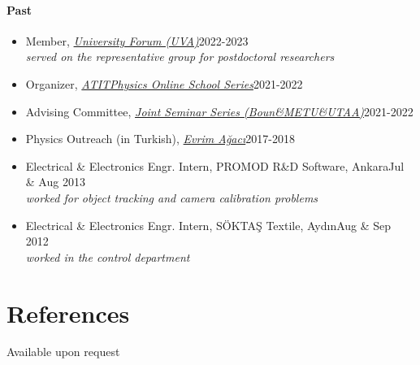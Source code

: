\documentclass[a4paper,11pt]{article}
\begin{document}
\paragraph{Past}
\begin{itemize}
	\item[] Member, \emph{\hyperref{https://www.uva.nl/en/about-the-uva/policy-and-regulations/policy/university-forum/university-forum.html}{}{}{University Forum (UVA)}}\hfill 2022-2023\hspace*{2.2em}\\
	    \hspace*{1.8em}\emph{served on the representative group for postdoctoral researchers}
	\item[] Organizer, \emph{\hyperref{https://www.atitphysics.com}{}{}{ATITPhysics Online School Series}}\hfill 2021-2022\hspace*{2.2em}
	\item[] Advising Committee, \emph{\hyperref{https://sites.google.com/view/boun-metu-utaajointseminerseri/}{}{}{Joint Seminar Series (Boun\&METU\&UTAA)}}\hfill 2021-2022\hspace*{2.2em}
	\item[] Physics Outreach (in Turkish), \emph{\hyperref{https://youtube.com/playlist?list=PL48IwtBKtXrZcWuuJFpcflBkSqJv6YrW9}{}{}{Evrim Ağacı}}\hfill 2017-2018
	\item[] Electrical \& Electronics Engr. Intern, PROMOD R\&D Software, Ankara\hfill Jul \& Aug 2013\\	
	    \hspace*{1.8em}\emph{worked for object tracking and camera calibration problems}
	\item[] Electrical \& Electronics Engr. Intern, SÖKTAŞ Textile, Aydın\hfill Aug \& Sep 2012\\	
	    \hspace*{1.8em}\emph{worked in the control department}
\end{itemize}

\section{\textcolor{burntorange}{References}}
\hspace*{2em}Available upon request

\end{document}
